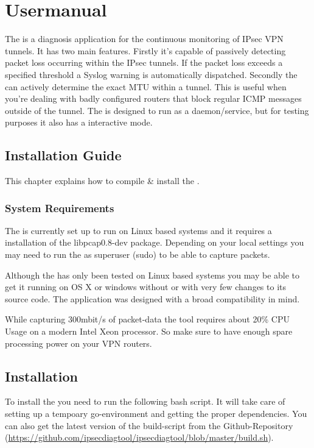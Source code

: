 \chapter{Usermanual}
\label{chap:Usermanual}
The \entool{} is a diagnosis application for the continuous monitoring of \acs{IPsec} \acs{VPN} tunnels. It has two main features. Firstly it's capable of passively detecting packet loss occurring within the \acs{IPsec} tunnels. If the packet loss exceeds a specified threshold a Syslog warning is automatically dispatched. Secondly the \entool{} can actively determine the exact \acs{MTU} within a tunnel. This is useful when you're dealing with badly configured routers that block regular \acs{ICMP} messages outside of the tunnel. The \entool{} is designed to run as a daemon/service, but for testing purposes it also has a interactive mode.

\section{Installation Guide}
This chapter explains how to compile \& install the \entool{}.

\subsection{System Requirements}
The \entool{} is currently set up to run on Linux based systems and it requires a installation of the libpcap0.8-dev package. Depending on your local settings you may need to run the \entool{} as superuser (sudo) to be able to capture packets.

Although the \entool{} has only been tested on Linux based systems you may be able to get it running on OS X or windows without or with very few changes to its source code. The application was designed with a broad compatibility in mind.

While capturing 300mbit/s of packet-data the tool requires about 20\% CPU Usage on a modern Intel Xeon processor. So make sure to have enough spare processing power on your VPN routers.


\section{Installation}
To install the \entool{} you need to run the following bash script. It will take care of setting up a tempoary go-environment and getting the proper dependencies. You can also get the latest version of the build-script from the Github-Repository (\url{https://github.com/ipsecdiagtool/ipsecdiagtool/blob/master/build.sh}).

